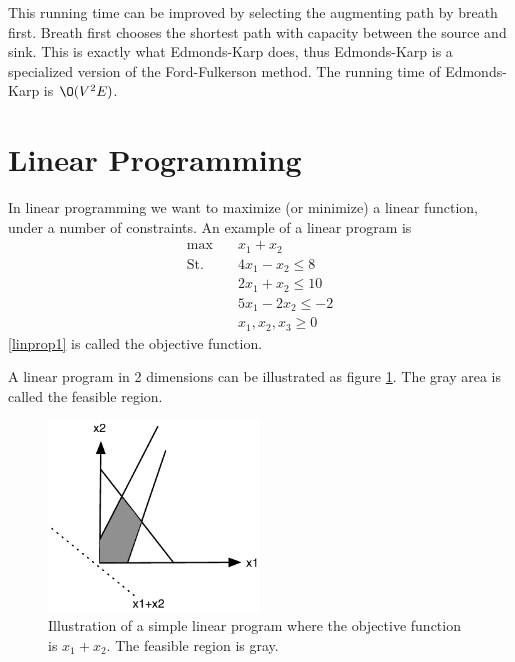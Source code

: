 \documentclass[10pt]{article}
\begin{document}
This running time can be improved by selecting the augmenting path by breath first. Breath first chooses the shortest path with capacity between the source and sink. This is exactly what Edmonds-Karp does, thus Edmonds-Karp is a specialized version of the Ford-Fulkerson method. The running time of Edmonds-Karp is $\O(V^2E)$.



\clearpage \newpage
\section{Linear Programming} %
\label{sec:linear_programming}

In linear programming we want to maximize (or minimize) a linear function, under a number of constraints. An example of a linear program is
\begin{align}
 \max &\quad x_1 + x_2 \label{linprop1}\\ 
 \text{St.} &\quad  4x_1 - x_2  \leq 8 \nonumber\\
            &\quad  2x_1 + x_2  \leq 10 \nonumber\\
            &\quad  5x_1 - 2x_2 \leq -2 \nonumber\\            
            &\quad  x_1,x_2,x_3 \geq 0  \nonumber
\end{align}
\ref{linprop1} is called the objective function.
                                                                      
A linear program in 2 dimensions can be illustrated as figure \ref{fig3}. The gray area is called the feasible region.
\begin{figure}[ht]
\centering
\includegraphics[width=0.5\textwidth]{figures/fig3.pdf}
\caption{Illustration of a simple linear program where the objective function is $x_1 + x_2$. The feasible region is gray.}
\label{fig3}
\end{figure}
\end{document}
